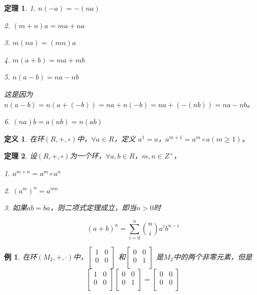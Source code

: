 \documentclass{article}
\newtheorem{Def}{定义}
\newtheorem{Thm}{定理}
\newtheorem*{Example}{例}
\begin{document}
\begin{CJK*}{UTF8}{gbsn}
\begin{Thm}
    1. $n(-a)=-(na)$
  
    2. $(m+n)a=ma + na$
  
    3. $m(na)=(mn)a$
  
    4. $m(a+b) = ma + mb$
  
    5. $n(a-b) = na - nb$
  
    这是因为$n(a-b)=n(a+(-b))=na+n(-b)=na+(-(nb))=na-nb$。
  
    6. $(na)b=a(nb)=n(ab)$
  
    
  \end{Thm}
  
  \begin{Def}
    在环$(R,+,\circ)$中，$\forall a\in R$，定义
    $a^1=a$，$a^{m+1}=a^m\circ a(m\geq 1)$。
  \end{Def}
  
  \begin{Thm}
    设$(R,+,\circ)$为一个环，$\forall a,b \in R$，$m, n \in Z^+$，
  
    1. $a^{m+n}=a^m \circ a^n$
  
    2. $(a^{m})^n=a^{mn}$
  
    3. 如果$ab=ba$，则二项式定理成立，即当$n>0$时
  
    \[(a+b)^n=\sum_{i=0}^{n}\binom{n}{i}a^ib^{n-i}\]
  \end{Thm}
  
  \begin{Example}
    在环$(M_2,+,\cdot)$中，$\begin{bmatrix}
      1&0\\
      0&0\\
    \end{bmatrix}$
    和$\begin{bmatrix}
      0&0\\
      0&1\\
    \end{bmatrix}$
    是$M_2$中的两个非零元素，但是\[\begin{bmatrix}
      1&0\\
      0&0\\
    \end{bmatrix}\begin{bmatrix}
      0&0\\
      0&1\\
    \end{bmatrix}=\begin{bmatrix}
      0&0\\
      0&0\\
    \end{bmatrix}\]
  \end{Example}
  

\end{CJK*}
\end{document}
